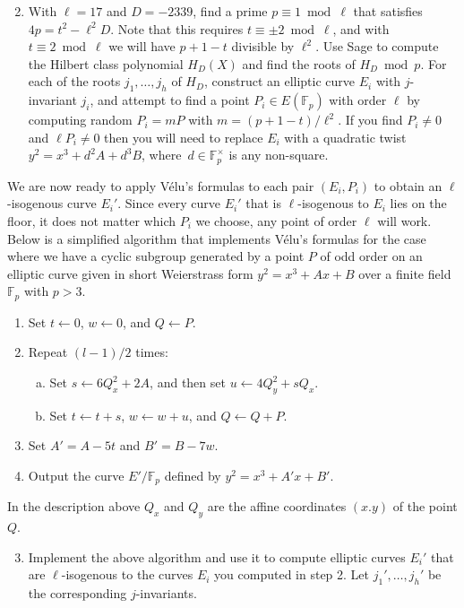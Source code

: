 \documentclass[11pt]{article}
\newcommand{\Fp}{\mathbb{F}_p}
\theoremstyle{definition}
\begin{document}
\begin{enumerate}[{\bf (a)}]
\setcounter{enumi}{1}
\item With $\ell=17$ and $D=-2339$, find a prime $p\equiv 1\bmod \ell$ that satisfies $4p=t^2-\ell^2D$.  Note that this requires $t\equiv \pm 2\bmod \ell$, and with $t\equiv 2\bmod \ell$ we will have $p+1-t$ divisible by $\ell^2$.
Use Sage to compute the Hilbert class polynomial $H_D(X)$ and find the roots of $H_D\bmod p$.
For each of the roots $j_1,\ldots, j_h$ of $H_D$, construct an elliptic curve $E_i$ with $j$-invariant $j_i$, and attempt to find a point $P_i\in E(\Fp)$ with order $\ell$ by computing random $P_i=mP$ with $m=(p+1-t)/\ell^2$.  If you find $P_i\ne 0$ and $\ell P_i\ne 0$ then you will need to replace $E_i$ with a quadratic twist $y^2=x^3+d^2A+d^3B$, where~$d\in \Fp^\times$ is any non-square.
\end{enumerate}

We are now ready to apply V\'{e}lu's formulas to each pair $(E_i,P_i)$ to obtain an $\ell$-isogenous curve $E_i'$.
Since every curve $E_i'$ that is $\ell$-isogenous to $E_i$ lies on the floor, it does not matter which $P_i$ we choose, any point of order $\ell$ will work.
Below is a simplified algorithm that implements V\'{e}lu's formulas for the case where we have a cyclic subgroup generated by a point $P$ of odd order on an elliptic curve given in short Weierstrass form $y^2=x^3+Ax+B$ over a finite field $\Fp$ with $p>3$.

\begin{enumerate}
\setlength{\itemsep}{0pt}
\item
Set $t\leftarrow 0$, $w\leftarrow 0$, and $Q\leftarrow P$.
\item
Repeat $(l-1)/2$ times:
\begin{enumerate}[a.]
\item
Set $s\leftarrow 6Q_x^2+2A$, and then set $u\leftarrow 4Q_y^2 + sQ_x$.
\item
Set $t\leftarrow t + s$, $w\leftarrow w + u$, and $Q\leftarrow Q + P$.
\end{enumerate}
\item
Set $A'=A-5t$ and $B'=B-7w$.
\item
Output the curve $E'/\Fp$ defined by $y^2=x^3+A'x+B'$.
\end{enumerate}

In the description above $Q_x$ and $Q_y$ are the affine coordinates $(x.y)$ of the point $Q$.

\begin{enumerate}[{\bf (a)}]
\setcounter{enumi}{2}
\item Implement the above algorithm and use it to compute elliptic curves $E_i'$ that are $\ell$-isogenous to the curves $E_i$ you computed in step 2.  Let $j_1',\ldots,j_h'$ be the corresponding $j$-invariants.
\end{enumerate}
\end{document}
